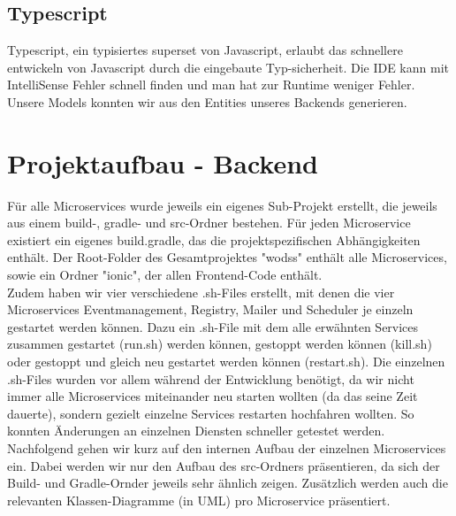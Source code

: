\documentclass[11pt]{article} %
\begin{document}
\subsection{Typescript}
Typescript, ein typisiertes superset von Javascript, erlaubt das schnellere entwickeln von Javascript durch die eingebaute Typ-sicherheit. Die IDE kann mit IntelliSense Fehler schnell finden und man hat zur Runtime weniger Fehler. Unsere Models konnten wir aus den Entities unseres Backends generieren.

\newpage
\section{Projektaufbau - Backend}
Für alle Microservices wurde jeweils ein eigenes Sub-Projekt erstellt, die jeweils aus einem build-, gradle- und src-Ordner bestehen. Für jeden Microservice existiert ein eigenes build.gradle, das die projektspezifischen Abhängigkeiten enthält.
Der Root-Folder des Gesamtprojektes "wodss" enthält alle Microservices, sowie ein Ordner "ionic", der allen Frontend-Code enthält.
\\
Zudem haben wir vier verschiedene .sh-Files erstellt, mit denen die vier Microservices Eventmanagement, Registry, Mailer und Scheduler je einzeln gestartet werden können. Dazu ein .sh-File mit dem alle erwähnten Services zusammen gestartet (run.sh) werden können, gestoppt werden können (kill.sh) oder gestoppt und gleich neu gestartet werden können (restart.sh). Die einzelnen .sh-Files wurden vor allem während der Entwicklung benötigt, da wir nicht immer alle Microservices miteinander neu starten wollten (da das seine Zeit dauerte), sondern gezielt einzelne Services restarten hochfahren wollten. So konnten Änderungen an einzelnen Diensten schneller getestet werden.
\\
Nachfolgend gehen wir kurz auf den internen Aufbau der einzelnen Microservices ein. Dabei werden wir nur den Aufbau des src-Ordners präsentieren, da sich der Build- und Gradle-Ornder jeweils sehr ähnlich zeigen. Zusätzlich werden auch die relevanten Klassen-Diagramme (in UML) pro Microservice präsentiert.
\end{document}
